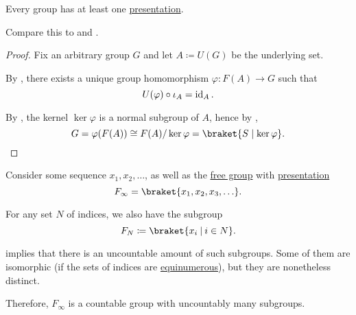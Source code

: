 \begin{proposition}\label{thm:group_presentation_existence}
  Every group has at least one \hyperref[def:group_presentation]{presentation}.
\end{proposition}
\begin{comments}
  \item Compare this to  and .
\end{comments}
\begin{proof}
  Fix an arbitrary group \( G \) and let \( A \coloneqq U(G) \) be the underlying set.

  By , there exists a unique group homomorphism \( \varphi: F(A) \to G \) such that
  \begin{equation*}
    U(\varphi) \bincirc \iota_A = \id_A.
  \end{equation*}

  By , the kernel \( \ker \varphi \) is a normal subgroup of \( A \), hence by ,
  \begin{equation*}
    G = \varphi(F(A)) \cong F(A) / \ker \varphi = \braket{ S \mid \ker \varphi }.
  \end{equation*}
\end{proof}

\begin{example}\label{ex:free_group_with_uncountably_many_subgroups}\cite{MathSE:countable_group_uncountably_many_distinct_subgroup}
  Consider some sequence \( x_1, x_2, \ldots \), as well as the \hyperref[def:free_group]{free group} with \hyperref[def:group_presentation]{presentation}
  \begin{equation*}
    F_\infty = \braket{ x_1, x_2, x_3, \ldots }.
  \end{equation*}

  For any set \( N \) of indices, we also have the subgroup
  \begin{equation*}
    F_N \coloneqq \braket{ x_i \given i \in N }.
  \end{equation*}

   implies that there is an uncountable amount of such subgroups. Some of them are isomorphic (if the sets of indices are \hyperref[def:equinumerosity]{equinumerous}), but they are nonetheless distinct.

  Therefore, \( F_\infty \) is a countable group with uncountably many subgroups.
\end{example}


